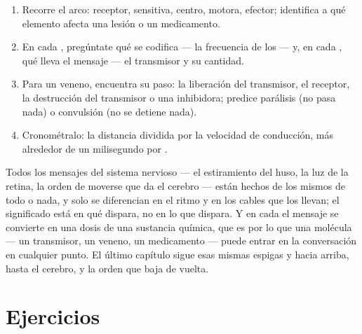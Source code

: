 \begin{method}\label{met:g12:stretch-reflex:analyse}
\begin{enumerate}
  \item Recorre el arco: receptor,  sensitiva, centro, 
        motora, efector; identifica a qué elemento afecta una lesión o
        un medicamento.
  \item En cada , pregúntate qué se codifica --- la frecuencia
        de los  --- y, en cada , qué lleva
        el mensaje --- el transmisor y su cantidad.
  \item Para un veneno, encuentra su paso: la liberación del
        transmisor, el receptor, la destrucción del transmisor o una
         inhibidora; predice parálisis (no pasa nada) o
        convulsión (no se detiene nada).
  \item Cronométralo: la distancia dividida por la velocidad de
        conducción, más alrededor de un milisegundo por .
\end{enumerate}
\end{method}

\begin{remark}\label{rem:g12:stretch-reflex:spikes}
Todos los mensajes del sistema nervioso --- el estiramiento del huso,
la luz de la retina, la orden de moverse que da el cerebro --- están
hechos de los mismos  de todo o nada, y solo se
diferencian en el ritmo y en los cables que los llevan; el significado
está en qué  dispara, no en lo que dispara. Y en cada 
el mensaje se convierte en una dosis de una sustancia química, que es
por lo que una molécula --- un transmisor, un veneno, un medicamento
--- puede entrar en la conversación en cualquier punto. El último
capítulo sigue esas mismas espigas y  hacia arriba, hasta el
cerebro, y la orden que baja de vuelta.
\end{remark}

\section{Ejercicios}

